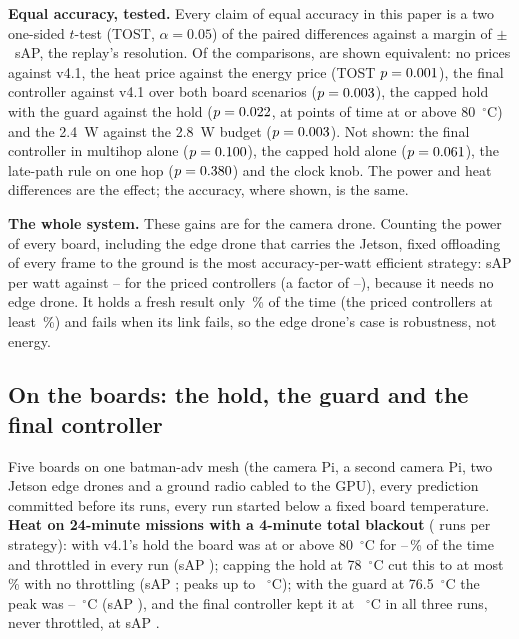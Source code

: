 \documentclass[conference]{IEEEtran}
\begin{document}
\textbf{Equal accuracy, tested.} Every claim of equal accuracy in this paper is a two one-sided $t$-test (TOST,
$\alpha = 0.05$) of the paired differences against a margin of $\pm$\EqMargin~sAP, the replay's resolution. Of the
\EqTotal{} comparisons, \EqShown{} are shown equivalent: no prices against v4.1, the heat price against the energy price
(TOST $p=0.001$), the final controller against v4.1 over both board scenarios ($p=0.003$), the capped hold with the
guard against the hold ($p=0.022$, at \EqCapGuardHot{} points of time at or above 80~$^\circ$C) and the 2.4~W
against the 2.8~W budget ($p=0.003$). Not shown: the final controller in multihop alone ($p=0.100$), the
capped hold alone ($p=0.061$), the late-path rule on one hop ($p=0.380$) and the clock knob. The power and heat
differences are the effect; the accuracy, where shown, is the same.

\textbf{The whole system.} These gains are for the camera drone. Counting the power of every board, including the edge
drone that carries the Jetson, fixed offloading of every frame to the ground is the most accuracy-per-watt efficient
strategy: \SysEffFixed{} sAP per watt against \SysEffMin--\SysEffMax{} for the priced controllers (a factor of
\SysEffRatioMin--\SysEffRatioMax), because it needs no edge drone. It holds a fresh result only \SysFixedAvail\,\% of
the time (the priced controllers at least \SysVAvailMin\,\%) and fails when its link fails, so the edge drone's case is
robustness, not energy.

\subsection{On the boards: the hold, the guard and the final controller}\label{sec:board}
Five boards on one batman-adv mesh (the camera Pi, a second camera Pi, two Jetson edge drones and a ground radio cabled
to the GPU), every prediction committed before its runs, every run started below a fixed board temperature.
\textbf{Heat on 24-minute missions with a 4-minute total blackout} (\BdHeatReps{} runs per strategy): with v4.1's hold
the board was at or above 80~$^\circ$C for \BdHoldHotMin--\BdHoldHotMax\,\% of the time and throttled in every run
(sAP \BdHoldSap); capping the hold at 78~$^\circ$C cut this to at most \BdCapHotMax\,\% with no throttling (sAP
\BdCapSap; peaks up to \BdCapPeakMax~$^\circ$C); with the guard at 76.5~$^\circ$C the peak was
\BdGuardPeakMin--\BdGuardPeakMax~$^\circ$C (sAP \BdGuardSap), and the final controller kept it at \BdFinPeak~$^\circ$C
in all three runs, never throttled, at sAP \BdFinSap.
\end{document}
